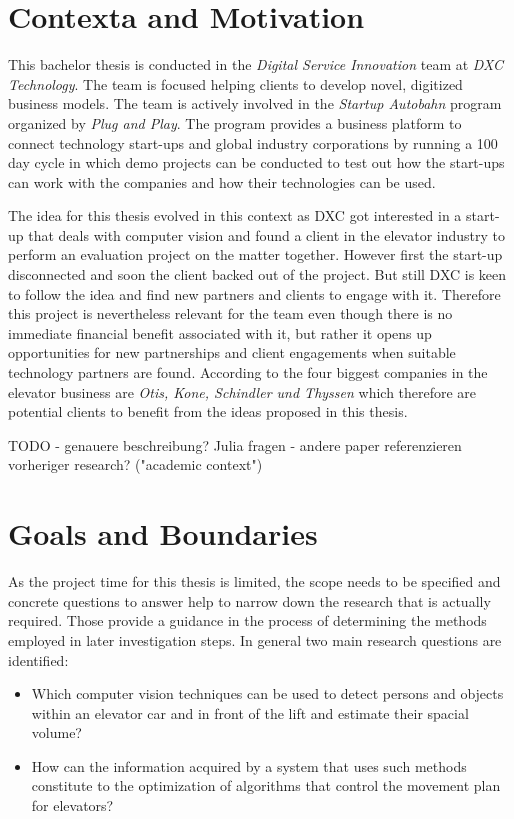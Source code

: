 \section{Contexta and Motivation}

This bachelor thesis is conducted in the \emph{Digital Service Innovation} team at \emph{DXC Technology}.
The team is focused helping clients to develop novel, digitized business models.
The team is actively involved in the \emph{Startup Autobahn} program organized by \emph{Plug and Play}.
The program provides a business platform to connect technology start-ups and global industry corporations
by running a 100 day cycle in which demo projects can be conducted to test out how the start-ups can work with the companies and how their technologies can be used.

The idea for this thesis evolved in this context as DXC got interested in a start-up that deals with computer vision and found a client in the elevator industry to perform an evaluation project on the matter together.
However first the start-up disconnected and soon the client backed out of the project.
But still DXC is keen to follow the idea and find new partners and clients to engage with it.
Therefore this project is nevertheless relevant for the team even though there is no immediate financial benefit associated with it, 
but rather it opens up opportunities for new partnerships and client engagements when suitable technology partners are found.
According to \textcite[][p.~4]{unger2015aufzuege} the four biggest companies in the elevator business are \emph{Otis, Kone, Schindler und Thyssen} which therefore are potential clients to benefit from the ideas proposed in this thesis.



TODO
- genauere beschreibung? Julia fragen
- andere paper referenzieren vorheriger research? ("academic context")


\section{Goals and Boundaries}

As the project time for this thesis is limited, the scope needs to be specified and concrete questions to answer help to narrow down the research that is actually required.
Those provide a guidance in the process of determining the methods employed in later investigation steps.
In general two main research questions are identified:

\begin{itemize}
    \item Which computer vision techniques can be used to detect persons and objects within an elevator car and in front of the lift and estimate their spacial volume?
    \item How can the information acquired by a system that uses such methods constitute to the optimization of algorithms that control the movement plan for elevators?
\end{itemize}

